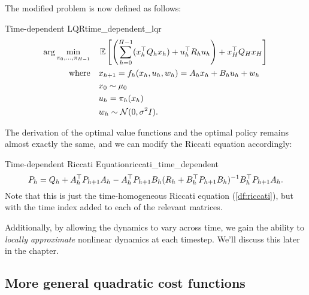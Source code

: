 \documentclass[\main/main]{subfiles}
\begin{document}
The modified problem is now defined as follows:

\begin{definition}{Time-dependent LQR}{time_dependent_lqr}
    \begin{align*}
        \arg \min_{\pi_{0}, \dots, \pi_{H-1}} \quad & \operatorname*{\mathbb{E}} \left[ \left( \sum_{h=0}^{H-1} (x_h^\top Q_h x_h) + u_h^\top R_h u_h \right) + x_H^\top Q_H x_H \right] \\
        \textrm{where} \quad & x_{h+1} = f_h(x_h, u_h, w_h) = A_h x_h + B_h u_h + w_h \\
        & x_0 \sim \mu_0 \\
        & u_h = \pi_h (x_h) \\
        & w_h \sim \mathcal{N}(0, \sigma^2 I).
    \end{align*}
\end{definition}

The derivation of the optimal value functions and the optimal policy remains almost exactly the same,
and we can modify the Riccati equation accordingly:

\begin{definition}{Time-dependent Riccati Equation}{riccati_time_dependent}
    \[
        P_h = Q_h + A_h^\top P_{h+1} A_h - A_h^\top P_{h+1} B_h (R_h + B_h^\top P_{h+1} B_h)^{-1} B_h^\top P_{h+1} A_h.
    \]
    Note that this is just the time-homogeneous Riccati equation (\autoref{df:riccati}),
    but with the
    time index added to each of the relevant matrices.
\end{definition}

Additionally, by allowing the dynamics to vary across time,
we gain the ability to \emph{locally approximate} nonlinear dynamics at each timestep.
We'll discuss this later in the chapter.

\subsection[General quadratic cost]{More general quadratic cost functions}
\end{document}
